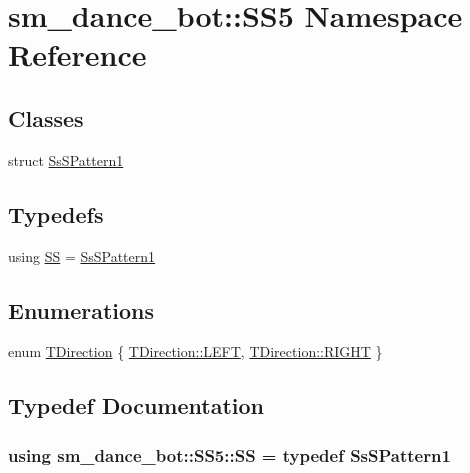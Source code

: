 \hypertarget{namespacesm__dance__bot_1_1SS5}{}\section{sm\+\_\+dance\+\_\+bot\+:\+:S\+S5 Namespace Reference}
\label{namespacesm__dance__bot_1_1SS5}
\subsection*{Classes}
\begin{DoxyCompactItemize}
\item 
struct \hyperlink{structsm__dance__bot_1_1SS5_1_1SsSPattern1}{Ss\+S\+Pattern1}
\end{DoxyCompactItemize}
\subsection*{Typedefs}
\begin{DoxyCompactItemize}
\item 
using \hyperlink{namespacesm__dance__bot_1_1SS5_a0205d7a46d2171e30393c1723859e277}{SS} = \hyperlink{structsm__dance__bot_1_1SS5_1_1SsSPattern1}{Ss\+S\+Pattern1}
\end{DoxyCompactItemize}
\subsection*{Enumerations}
\begin{DoxyCompactItemize}
\item 
enum \hyperlink{namespacesm__dance__bot_1_1SS5_aaa01c87b9245bbff2b581cefd6f3b346}{T\+Direction} \{ \hyperlink{namespacesm__dance__bot_1_1SS5_aaa01c87b9245bbff2b581cefd6f3b346a684d325a7303f52e64011467ff5c5758}{T\+Direction\+::\+L\+E\+FT}, 
\hyperlink{namespacesm__dance__bot_1_1SS5_aaa01c87b9245bbff2b581cefd6f3b346a21507b40c80068eda19865706fdc2403}{T\+Direction\+::\+R\+I\+G\+HT}
 \}
\end{DoxyCompactItemize}


\subsection{Typedef Documentation}
\subsubsection[{\texorpdfstring{SS}{SS}}]{\setlength{\rightskip}{0pt plus 5cm}using {\bf sm\+\_\+dance\+\_\+bot\+::\+S\+S5\+::\+SS} = typedef {\bf Ss\+S\+Pattern1}}\hypertarget{namespacesm__dance__bot_1_1SS5_a0205d7a46d2171e30393c1723859e277}{}\label{namespacesm__dance__bot_1_1SS5_a0205d7a46d2171e30393c1723859e277}


